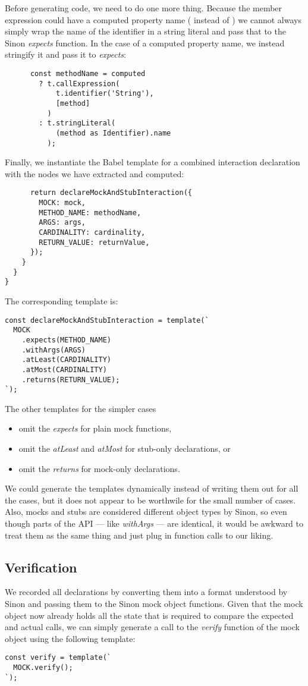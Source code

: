 Before generating code,
we need to do one more thing.
Because the member expression could have a computed property name
( instead of )
we cannot always simply wrap the name of the identifier
in a string literal and pass that
to the Sinon \textit{expects} function.
In the case of a computed property name,
we instead stringify it and pass it to \textit{expects}:
\begin{verbatim}
      const methodName = computed
        ? t.callExpression(
            t.identifier('String'),
            [method]
          )
        : t.stringLiteral(
            (method as Identifier).name
          );
\end{verbatim}

Finally, we instantiate the Babel template
for a combined interaction declaration
with the nodes we have extracted and computed:
\begin{verbatim}
      return declareMockAndStubInteraction({
        MOCK: mock,
        METHOD_NAME: methodName,
        ARGS: args,
        CARDINALITY: cardinality,
        RETURN_VALUE: returnValue,
      });
    }
  }
}
\end{verbatim}

The corresponding template is:
\begin{verbatim}
const declareMockAndStubInteraction = template(`
  MOCK
    .expects(METHOD_NAME)
    .withArgs(ARGS)
    .atLeast(CARDINALITY)
    .atMost(CARDINALITY)
    .returns(RETURN_VALUE);
`);
\end{verbatim}
The other templates for the simpler cases
\begin{itemize}
  \item omit the \textit{expects} for plain mock functions,
  \item omit the \textit{atLeast} and \textit{atMost} for stub-only declarations, or
  \item omit the \textit{returns} for mock-only declarations.
\end{itemize}

We could generate the templates dynamically
instead of writing them out for all the cases,
but it does not appear to be worthwile for the small number of cases.
Also, mocks and stubs are considered different object types by Sinon,
so even though parts of the API --- like \textit{withArgs} --- are identical,
it would be awkward to treat them as the same thing
and just plug in function calls to our liking.

\subsection{Verification}
We recorded all declarations by
converting them into a format understood by Sinon
and passing them to the Sinon mock object functions.
Given that the mock object now already holds all the state
that is required to compare the expected and actual calls,
we can simply generate a call to the \textit{verify} function
of the mock object using the following template:
\begin{verbatim}
const verify = template(`
  MOCK.verify();
`);
\end{verbatim}
